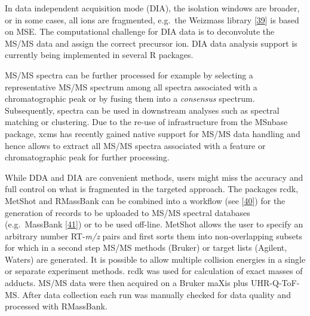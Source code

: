 \documentclass[]{article}
\begin{document}
In data independent acquisition mode (DIA), the isolation windows are broader, or in some cases, all ions are fragmented, e.g.~the Weizmass library {[}\protect\hyperlink{ref-shahaf_2016}{39}{]} is based on MSE. The computational challenge for DIA data is to deconvolute the MS/MS data and assign the correct precursor ion. DIA data analysis support is currently being implemented in several R packages.

MS/MS spectra can be further processed for example by selecting a representative MS/MS spectrum among all spectra associated with a chromatographic peak or by fusing them into a \emph{consensus} spectrum. Subsequently, spectra can be used in downstream analyses such as spectral matching or clustering. Due to the re-use of infrastructure from the MSnbase package, xcms has recently gained native support for MS/MS data handling and hence allows to extract all MS/MS spectra associated with a feature or chromatographic peak for further processing.

While DDA and DIA are convenient methods, users might miss the accuracy and full control on what is fragmented in the targeted approach. The packages rcdk, MetShot and RMassBank can be combined into a workflow (see {[}\protect\hyperlink{ref-witting_website_nd}{40}{]}) for the generation of records to be uploaded to MS/MS spectral databases (e.g.~MassBank {[}\protect\hyperlink{ref-horai_2010}{41}{]}) or to be used off-line. MetShot allows the user to specify an arbitrary number RT-\emph{m/z} pairs and first sorts them into non-overlapping subsets for which in a second step MS/MS methods (Bruker) or target lists (Agilent, Waters) are generated. It is possible to allow multiple collision energies in a single or separate experiment methods. rcdk was used for calculation of exact masses of adducts. MS/MS data were then acquired on a Bruker maXis plus UHR-Q-ToF-MS. After data collection each run was manually checked for data quality and processed with RMassBank.
\end{document}
